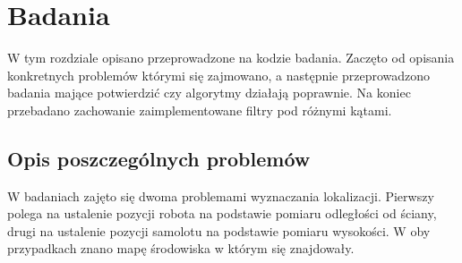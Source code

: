 \chapter{Badania} \label{przeg}
W tym rozdziale opisano przeprowadzone na kodzie badania. Zaczęto od opisania konkretnych problemów którymi się zajmowano, a następnie przeprowadzono badania mające potwierdzić czy algorytmy działają poprawnie. Na koniec przebadano zachowanie zaimplementowane filtry pod różnymi kątami.
\section{Opis poszczególnych problemów}
W badaniach zajęto się dwoma problemami wyznaczania lokalizacji. Pierwszy polega na ustalenie pozycji robota na podstawie pomiaru odległości od ściany, drugi na ustalenie pozycji samolotu na podstawie pomiaru wysokości. W oby przypadkach znano mapę środowiska w którym się znajdowały.
